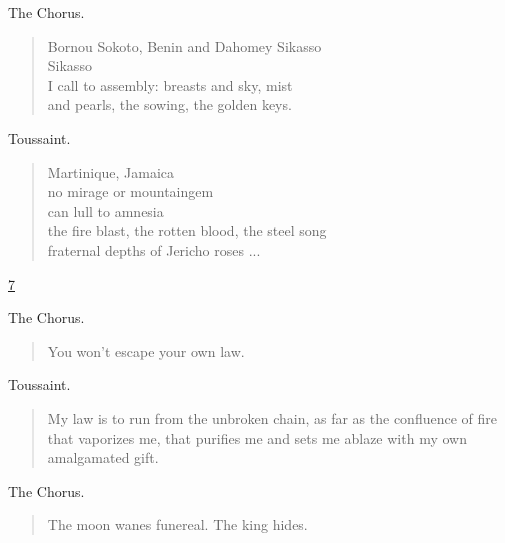 \documentclass[letterpaper,article,12pt,oneside,notitlepage]{memoir}
\begin{document}
\begin{center}The Chorus.\end{center}

\begin{verse}
Bornou Sokoto, Benin and Dahomey Sikasso \\
Sikasso \\
I call to assembly: breasts and sky, mist \\
and pearls, the sowing, the golden keys. \\
\end{verse}

\begin{center}Toussaint.\end{center}

\begin{verse}
Martinique, Jamaica \\
no mirage or mountaingem \\
can lull to amnesia \\
the fire blast, the rotten blood, the steel song \\
fraternal depths of Jericho roses  ... \\
\end{verse}

\clearpage

\href{http://cesaire.elotroalex.com/chiens/chiens/p007.html}{7}

\begin{center}The Chorus.\end{center}

\begin{verse}
\hspace{1cm} You won't escape your own law. \\
\end{verse}

\begin{center}Toussaint.\end{center}

\begin{verse}
\indent My law is to run from the unbroken chain, as far as the confluence of fire that vaporizes me, that purifies me and sets me ablaze with my own amalgamated gift. \\
\end{verse}

\begin{center}The Chorus.\end{center}

\begin{verse}
The moon wanes funereal. The king hides. \\
\end{verse}
\end{document}
